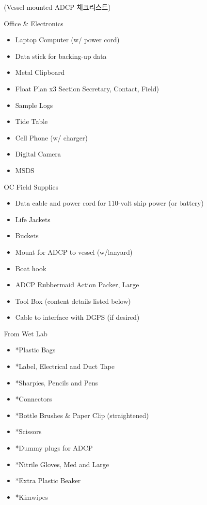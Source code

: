 \documentclass[
]{book}
\providecommand{\tightlist}{%
  \setlength{\itemsep}{0pt}\setlength{\parskip}{0pt}}
\begin{document}
(Vessel-mounted ADCP 체크리스트)

Office \& Electronics

\begin{itemize}
\tightlist
\item
  Laptop Computer (w/ power cord)
\item
  Data stick for backing-up data
\item
  Metal Clipboard
\item
  Float Plan x3 Section Secretary, Contact, Field)
\item
  Sample Logs
\item
  Tide Table
\item
  Cell Phone (w/ charger)
\item
  Digital Camera
\item
  MSDS
\end{itemize}

OC Field Supplies

\begin{itemize}
\tightlist
\item
  Data cable and power cord for 110-volt ship power (or battery)
\item
  Life Jackets
\item
  Buckets
\item
  Mount for ADCP to vessel (w/lanyard)
\item
  Boat hook
\item
  ADCP Rubbermaid Action Packer, Large
\item
  Tool Box (content details listed below)
\item
  Cable to interface with DGPS (if desired)
\end{itemize}

From Wet Lab

\begin{itemize}
\tightlist
\item
  *Plastic Bags
\item
  *Label, Electrical and Duct Tape
\item
  *Sharpies, Pencils and Pens
\item
  *Connectors
\item
  *Bottle Brushes \& Paper Clip
  (straightened)
\item
  *Scissors
\item
  *Dummy plugs for ADCP
\item
  *Nitrile Gloves, Med and Large
\item
  *Extra Plastic Beaker
\item
  *Kimwipes
\end{itemize}
\end{document}
